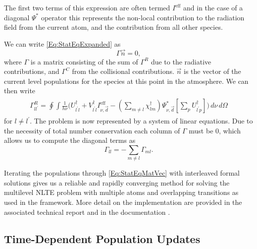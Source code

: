 The first two terms of this expression are often termed $I^\mathrm{eff}$ and in the case of a diagonal $\Psi^*$ operator this represents the non-local contribution to the radiation field from the current atom, and the contribution from all other species.

We can write \eqref{Eq:StatEqExpanded} as
\begin{equation}
    \Gamma \vec{n} = 0,
    \label{Eq:StatEqMatVec}
\end{equation}
where $\Gamma$ is a matrix consisting of the sum of $\Gamma^R$ due to the radiative contributions, and $\Gamma^C$ from the collisional contributions. $\vec{n}$ is the vector of the current level populations for the species at this point in the atmosphere.
We can then write
\begin{align}
\begin{split}\label{Eq:GammaR}
    \Gamma^R_{ll^\prime} = \oint \int \frac{1}{h\nu} \bigg( U^\dagger_{l^\prime l} + V^\dagger_{l^\prime l}I_{\nu, \vec{d}}^\mathrm{eff} -
    \left(\sum_{m\neq l}\chi^\dagger_{lm}\right) \Psi^*_{\nu, \vec{d}} \left[ \sum_p U^\dagger_{l^\prime p} \right] \bigg)\, d\nu\,d\Omega
\end{split}
\end{align}
for $l\neq l^\prime$. The problem is now represented by a system of linear equations. Due to the necessity of total number conservation each column of $\Gamma$ must be 0, which allows us to compute the diagonal terms as
\begin{equation}
    \Gamma_{ll} = -\sum_{m\neq l} \Gamma_{ml}.
\end{equation}

Iterating the populations through \eqref{Eq:StatEqMatVec} with interleaved formal solutions gives us a reliable and rapidly converging method for solving the multilevel NLTE problem with multiple atoms and overlapping transitions as used in the \Lw{} framework. More detail on the implementation are provided in the associated technical report \citep{Osborne2021} and in the documentation \NeedRef{}.

\subsection{Time-Dependent Population Updates}\label{Sec:TimeDepPopUpdates}

